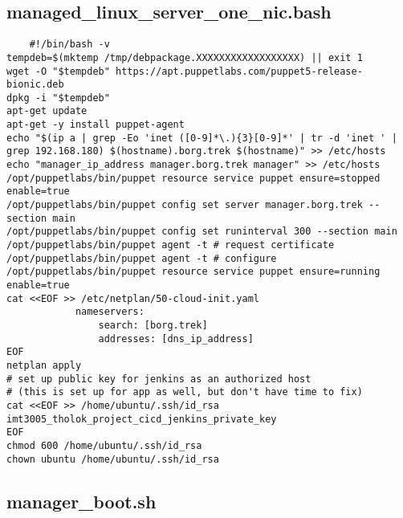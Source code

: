 \subsection{managed\_linux\_server\_one\_nic.bash}

\begin{verbatim}
	#!/bin/bash -v
tempdeb=$(mktemp /tmp/debpackage.XXXXXXXXXXXXXXXXXX) || exit 1
wget -O "$tempdeb" https://apt.puppetlabs.com/puppet5-release-bionic.deb
dpkg -i "$tempdeb"
apt-get update
apt-get -y install puppet-agent
echo "$(ip a | grep -Eo 'inet ([0-9]*\.){3}[0-9]*' | tr -d 'inet ' | grep 192.168.180) $(hostname).borg.trek $(hostname)" >> /etc/hosts
echo "manager_ip_address manager.borg.trek manager" >> /etc/hosts
/opt/puppetlabs/bin/puppet resource service puppet ensure=stopped enable=true
/opt/puppetlabs/bin/puppet config set server manager.borg.trek --section main
/opt/puppetlabs/bin/puppet config set runinterval 300 --section main
/opt/puppetlabs/bin/puppet agent -t # request certificate
/opt/puppetlabs/bin/puppet agent -t # configure 
/opt/puppetlabs/bin/puppet resource service puppet ensure=running enable=true
cat <<EOF >> /etc/netplan/50-cloud-init.yaml
            nameservers:
                search: [borg.trek]
                addresses: [dns_ip_address]
EOF
netplan apply
# set up public key for jenkins as an authorized host
# (this is set up for app as well, but don't have time to fix)
cat <<EOF >> /home/ubuntu/.ssh/id_rsa
imt3005_tholok_project_cicd_jenkins_private_key
EOF
chmod 600 /home/ubuntu/.ssh/id_rsa
chown ubuntu /home/ubuntu/.ssh/id_rsa
\end{verbatim}

\subsection{manager\_boot.sh}

